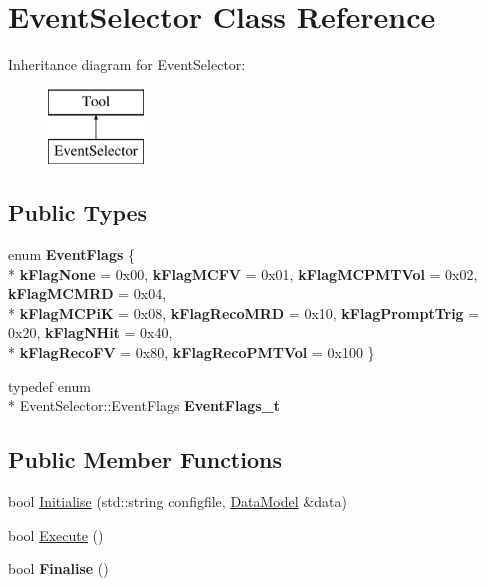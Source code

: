 \hypertarget{classEventSelector}{\section{Event\-Selector Class Reference}
\label{classEventSelector}
}
Inheritance diagram for Event\-Selector\-:\begin{figure}[H]
\begin{center}
\leavevmode
\includegraphics[height=2.000000cm]{classEventSelector}
\end{center}
\end{figure}
\subsection*{Public Types}
\begin{DoxyCompactItemize}
\item 
enum {\bfseries Event\-Flags} \{ \\*
{\bfseries k\-Flag\-None} = 0x00, 
{\bfseries k\-Flag\-M\-C\-F\-V} = 0x01, 
{\bfseries k\-Flag\-M\-C\-P\-M\-T\-Vol} = 0x02, 
{\bfseries k\-Flag\-M\-C\-M\-R\-D} = 0x04, 
\\*
{\bfseries k\-Flag\-M\-C\-Pi\-K} = 0x08, 
{\bfseries k\-Flag\-Reco\-M\-R\-D} = 0x10, 
{\bfseries k\-Flag\-Prompt\-Trig} = 0x20, 
{\bfseries k\-Flag\-N\-Hit} = 0x40, 
\\*
{\bfseries k\-Flag\-Reco\-F\-V} = 0x80, 
{\bfseries k\-Flag\-Reco\-P\-M\-T\-Vol} = 0x100
 \}
\item 
\hypertarget{classEventSelector_ab9f5d192d2badda9754e2e91f430a012}{typedef enum \\*
Event\-Selector\-::\-Event\-Flags {\bfseries Event\-Flags\-\_\-t}}\label{classEventSelector_ab9f5d192d2badda9754e2e91f430a012}

\end{DoxyCompactItemize}
\subsection*{Public Member Functions}
\begin{DoxyCompactItemize}
\item 
bool \hyperlink{classEventSelector_a839f44332021b0345d0277f68ae612a8}{Initialise} (std\-::string configfile, \hyperlink{classDataModel}{Data\-Model} \&data)
\item 
bool \hyperlink{classEventSelector_a0edbb6c1b1a8c3fcd9453d3dd5796005}{Execute} ()
\item 
\hypertarget{classEventSelector_a73c813845d7cfce13f160e94b44b56c1}{bool {\bfseries Finalise} ()}\label{classEventSelector_a73c813845d7cfce13f160e94b44b56c1}

\end{DoxyCompactItemize}


